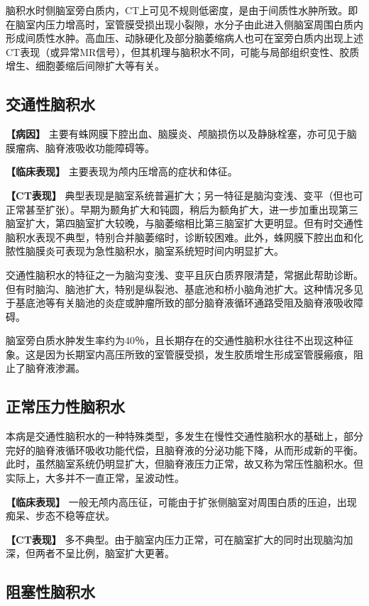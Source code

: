 脑积水时侧脑室旁白质内，CT上可见不规则低密度，是由于间质性水肿所致。即在脑室内压力增高时，室管膜受损出现小裂隙，水分子由此进入侧脑室周围白质内形成间质性水肿。高血压、动脉硬化及部分脑萎缩病人也可在室旁白质内出现上述CT表现（或异常MR信号），但其机理与脑积水不同，可能与局部组织变性、胶质增生、细胞萎缩后间隙扩大等有关。

\subsection{交通性脑积水}

\textbf{【病因】}
主要有蛛网膜下腔出血、脑膜炎、颅脑损伤以及静脉栓塞，亦可见于脑膜瘤病、脑脊液吸收功能障碍等。

\textbf{【临床表现】} 主要表现为颅内压增高的症状和体征。

\textbf{【CT表现】}
典型表现是脑室系统普遍扩大；另一特征是脑沟变浅、变平（但也可正常甚至扩张）。早期为颞角扩大和钝圆，稍后为额角扩大，进一步加重出现第三脑室扩大，第四脑室扩大较晚，与脑萎缩相比第三脑室扩大更明显。但有时交通性脑积水表现不典型，特别合并脑萎缩时，诊断较困难。此外，蛛网膜下腔出血和化脓性脑膜炎可表现为急性脑积水，脑室系统短时间内明显扩大。

交通性脑积水的特征之一为脑沟变浅、变平且灰白质界限清楚，常据此帮助诊断。但有时脑沟、脑池扩大，特别是纵裂池、基底池和桥小脑角池扩大。这种情况多见于基底池等有关脑池的炎症或肿瘤所致的部分脑脊液循环通路受阻及脑脊液吸收障碍。

脑室旁白质水肿发生率约为40％，且长期存在的交通性脑积水往往不出现这种征象。这是因为长期室内高压所致的室管膜受损，发生胶质增生形成室管膜瘢痕，阻止了脑脊液渗漏。

\subsection{正常压力性脑积水}

本病是交通性脑积水的一种特殊类型，多发生在慢性交通性脑积水的基础上，部分完好的脑脊液循环吸收功能代偿，且脑脊液的分泌功能下降，从而形成新的平衡。此时，虽然脑室系统仍明显扩大，但脑脊液压力正常，故又称为常压性脑积水。但实际上，大多并不一直正常，呈波动性。

\textbf{【临床表现】}
一般无颅内高压征，可能由于扩张侧脑室对周围白质的压迫，出现痴呆、步态不稳等症状。

\textbf{【CT表现】}
多不典型。由于脑室内压力正常，可在脑室扩大的同时出现脑沟加深，但两者不呈比例，脑室扩大更著。

\subsection{阻塞性脑积水}

